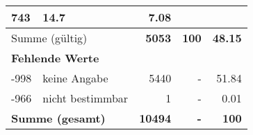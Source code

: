 \begin{longtable}{lXrrr}
       \num{743} &
       \num[round-mode=places,round-precision=2]{14.7} &
         \num[round-mode=places,round-precision=2]{7.08} \\
     \midrule
     \multicolumn{2}{l}{Summe (gültig)} &
       \textbf{\num{5053}} &
     \textbf{\num{100}} &
       \textbf{\num[round-mode=places,round-precision=2]{48.15}} \\
     \multicolumn{5}{l}{\textbf{Fehlende Werte}}\\
       -998 &
       keine Angabe &
         \num{5440} &
        - &
         \num[round-mode=places,round-precision=2]{51.84} \\
       -966 &
       nicht bestimmbar &
         \num{1} &
        - &
         \num[round-mode=places,round-precision=2]{0.01} \\
     \midrule
     \multicolumn{2}{l}{\textbf{Summe (gesamt)}} &
          \textbf{\num{10494}} &
        \textbf{-} &
        \textbf{\num{100}} \\
     \bottomrule
     \end{longtable}
     
